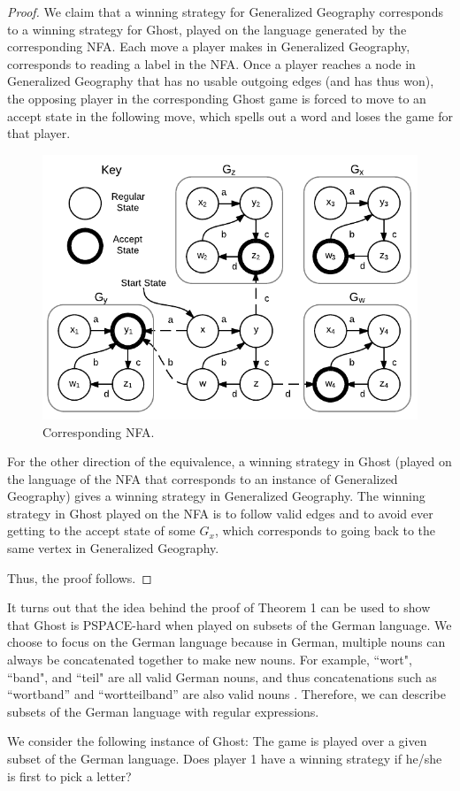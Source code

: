 \documentclass[runningheads,a4paper]{llncs}
\begin{document}
\begin{proof}
We claim that a winning strategy for Generalized Geography corresponds to a winning strategy for Ghost, played on the language generated by the corresponding NFA. Each move a player makes in Generalized Geography, corresponds to reading a label in the NFA. Once a player reaches a node in Generalized Geography that has no usable outgoing edges (and has thus won), the opposing player in the corresponding Ghost game is forced to move to an accept state in the following move, which spells out a word and loses the game for that player. 


\begin{figure}[!ht]
\centering
\includegraphics[width=0.6\linewidth]{Ghost2.pdf}
\caption{Corresponding NFA.}
\label{fig:reduction}
\end{figure}

For the other direction of the equivalence, a winning strategy in Ghost (played on the language of the NFA that corresponds to an instance of Generalized Geography) gives a winning strategy in Generalized Geography. The winning strategy in Ghost played on the NFA is to follow valid edges and to avoid ever getting to the accept state of some $G_x$, which corresponds to going back to the same vertex in Generalized Geography.

Thus, the proof follows. 
\end{proof}

It turns out that the idea behind the proof of Theorem 1 can be used to show that Ghost is PSPACE-hard when played on subsets of the German language. We choose to focus on the German language because in German, multiple nouns can always be concatenated together to make new nouns. For example, ``wort", ``band", and ``teil" are all valid German nouns, and thus concatenations such as “wortband” and “wortteilband” are also valid nouns \cite{german}. Therefore, we can describe subsets of the German language with regular expressions.

We consider the following instance of Ghost: The game is played over a given subset of the German language. Does player 1 have a winning strategy if he/she is first to pick a letter?
\end{document}
